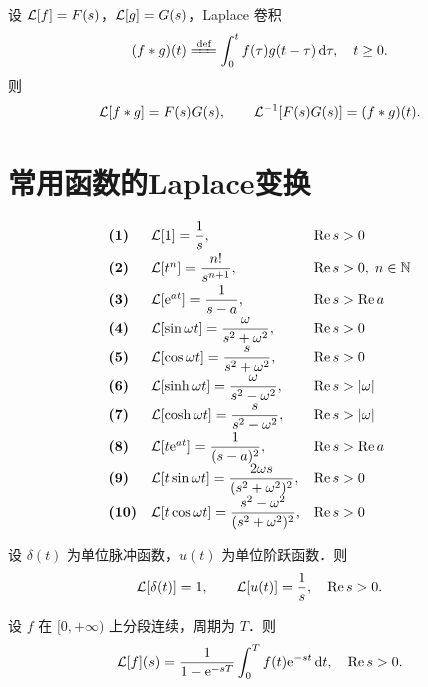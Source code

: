 \documentclass[12pt, a4paper, oneside, UTF8]{ctexbook}
\begin{document}
\begin{theorem}[卷积定理]
设 $\mathcal{L}[f]=F(s)$，$\mathcal{L}[g]=G(s)$，Laplace 卷积
\[
(f*g)(t) \defeq \int_0^t f(\tau)g(t-\tau)\,\d\tau,\quad t\ge 0.
\]
则
\[
\mathcal{L}[f*g] = F(s)G(s),\qquad \mathcal{L}^{-1}[F(s)G(s)] = (f*g)(t).
\]
\end{theorem}

\section{常用函数的Laplace变换}

\begin{theorem}
\[
\begin{array}{lll}
\textbf{(1)} & \mathcal{L}[1] = \dfrac{1}{s}, & \Re s > 0 \\[6pt]
\textbf{(2)} & \mathcal{L}[t^n] = \dfrac{n!}{s^{n+1}}, & \Re s > 0,\; n\in\mathbb{N} \\[6pt]
\textbf{(3)} & \mathcal{L}[\mathrm{e}^{at}] = \dfrac{1}{s-a}, & \Re s > \Re a \\[6pt]
\textbf{(4)} & \mathcal{L}[\sin\omega t] = \dfrac{\omega}{s^2+\omega^2}, & \Re s > 0 \\[6pt]
\textbf{(5)} & \mathcal{L}[\cos\omega t] = \dfrac{s}{s^2+\omega^2}, & \Re s > 0 \\[6pt]
\textbf{(6)} & \mathcal{L}[\sinh\omega t] = \dfrac{\omega}{s^2-\omega^2}, & \Re s > \abs{\omega} \\[6pt]
\textbf{(7)} & \mathcal{L}[\cosh\omega t] = \dfrac{s}{s^2-\omega^2}, & \Re s > \abs{\omega} \\[6pt]
\textbf{(8)} & \mathcal{L}[t\mathrm{e}^{at}] = \dfrac{1}{(s-a)^2}, & \Re s > \Re a \\[6pt]
\textbf{(9)} & \mathcal{L}[t\sin\omega t] = \dfrac{2\omega s}{(s^2+\omega^2)^2}, & \Re s > 0 \\[6pt]
\textbf{(10)} & \mathcal{L}[t\cos\omega t] = \dfrac{s^2-\omega^2}{(s^2+\omega^2)^2}, & \Re s > 0
\end{array}
\]
\end{theorem}

\begin{theorem}[单位脉冲与单位阶跃]
设 $\delta(t)$ 为单位脉冲函数，$u(t)$ 为单位阶跃函数．则
\[
\mathcal{L}[\delta(t)] = 1,\qquad \mathcal{L}[u(t)] = \frac{1}{s},\quad \Re s > 0.
\]
\end{theorem}

\begin{theorem}
设 $f$ 在 $[0,+\infty)$ 上分段连续，周期为 $T$．则
\[
\mathcal{L}[f](s) = \frac{1}{1-\mathrm{e}^{-sT}}\int_0^{T} f(t)\mathrm{e}^{-st}\,\mathrm{d} t,\quad \Re s > 0.
\]
\end{theorem}
\end{document}
